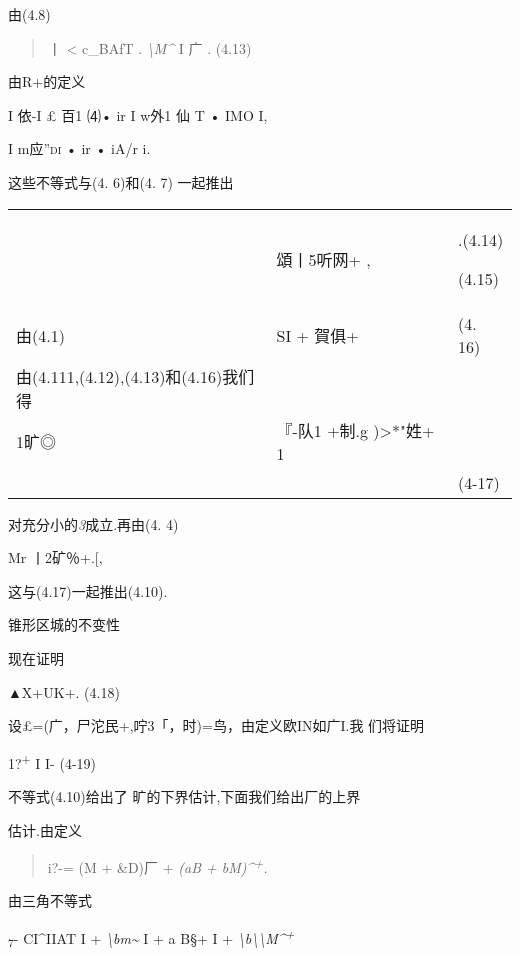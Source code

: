 \documentclass{article}
\begin{document}
由(4.8)

\begin{quote}
丨 \textless{} \textbar{}c\textbar{}\textbar{}\_BAfT\textbar{} .
\emph{\textbackslash{}M\^{}} I 广 \textbar{}. (4.13)
\end{quote}

由R+的定义

I 依-I £ 百1 ⑷• ir I w外1\textbar{} 仙 T\textbar{} • IMO I,

I m应\textsc{''di} • ir • iA/r i.

这些不等式与(4. 6)和(4. 7) 一起推出

\begin{longtable}[]{@{}lll@{}}
\toprule
\endhead
\begin{minipage}[t]{0.30\columnwidth}\raggedright
\strut
\end{minipage} & \begin{minipage}[t]{0.30\columnwidth}\raggedright
\textbar{}頌丨5听网+ \textbar{},\strut
\end{minipage} & \begin{minipage}[t]{0.30\columnwidth}\raggedright
.(4.14)

(4.15)\strut
\end{minipage}\tabularnewline
由(4.1) & SI + 賀俱+ & (4. 16)\tabularnewline
由(4.111,(4.12),(4.13)和(4.16)我们得 & &\tabularnewline
1旷◎ & 『-队1 +制.g )\textgreater{}*"\textbar{}姓+ 1 &\tabularnewline
& & (4-17)\tabularnewline
\bottomrule
\end{longtable}

对充分小的\emph{3}成立.再由(4. 4)

\textbar{}Mr 丨2矿％+.{[},

这与(4.17)一起推出(4.10).

锥形区城的不变性

现在证明

▲X+UK+. (4.18)

设£=(广，尸沱民+,咛3「，时)=鸟，由定义欧IN如广I.我 们将证明

1?\textsuperscript{+} I I- (4-19)

不等式(4.10)给出了
\textbar{}旷\textbar{}的下界估计,下面我们给出\textbar{}厂\textbar{}的上界

估计.由定义

\begin{quote}
i?-= (M + \&D)厂 + \emph{(aB + bM)\^{}\textsuperscript{+}.}
\end{quote}

由三角不等式

\textbar{}\textsubscript{7}- \textbar{} CI\^{}IIAT I +
\emph{\textbackslash{}bm\textasciitilde{}} I + \textbar{}a\textbar{}
\textbar{}B§+ I +
\emph{\textbackslash{}b\textbackslash{}\textbackslash{}M\^{}\textsuperscript{+}}
\end{document}
